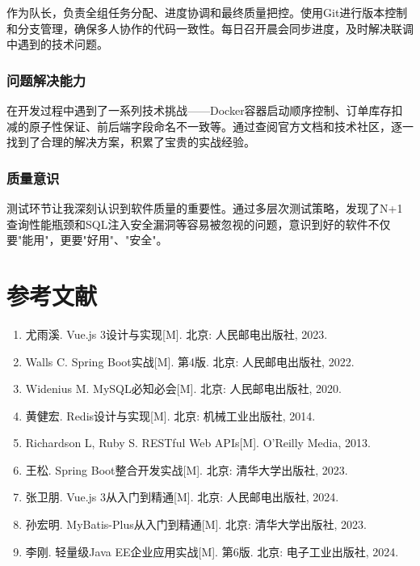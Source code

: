 \documentclass[12pt,a4paper,oneside]{ctexart}
\begin{document}
作为队长，负责全组任务分配、进度协调和最终质量把控。使用Git进行版本控制和分支管理，确保多人协作的代码一致性。每日召开晨会同步进度，及时解决联调中遇到的技术问题。

\subsubsection{问题解决能力}

在开发过程中遇到了一系列技术挑战——Docker容器启动顺序控制、订单库存扣减的原子性保证、前后端字段命名不一致等。通过查阅官方文档和技术社区，逐一找到了合理的解决方案，积累了宝贵的实战经验。

\subsubsection{质量意识}

测试环节让我深刻认识到软件质量的重要性。通过多层次测试策略，发现了N+1查询性能瓶颈和SQL注入安全漏洞等容易被忽视的问题，意识到好的软件不仅要"能用"，更要"好用"、"安全"。

\section{参考文献}

\begin{enumerate}[nosep]
    \item 尤雨溪. Vue.js 3设计与实现[M]. 北京: 人民邮电出版社, 2023.
    \item Walls C. Spring Boot实战[M]. 第4版. 北京: 人民邮电出版社, 2022.
    \item Widenius M. MySQL必知必会[M]. 北京: 人民邮电出版社, 2020.
    \item 黄健宏. Redis设计与实现[M]. 北京: 机械工业出版社, 2014.
    \item Richardson L, Ruby S. RESTful Web APIs[M]. O'Reilly Media, 2013.
    \item 王松. Spring Boot整合开发实战[M]. 北京: 清华大学出版社, 2023.
    \item 张卫朋. Vue.js 3从入门到精通[M]. 北京: 人民邮电出版社, 2024.
    \item 孙宏明. MyBatis-Plus从入门到精通[M]. 北京: 清华大学出版社, 2023.
    \item 李刚. 轻量级Java EE企业应用实战[M]. 第6版. 北京: 电子工业出版社, 2024.
\end{enumerate}
\end{document}

